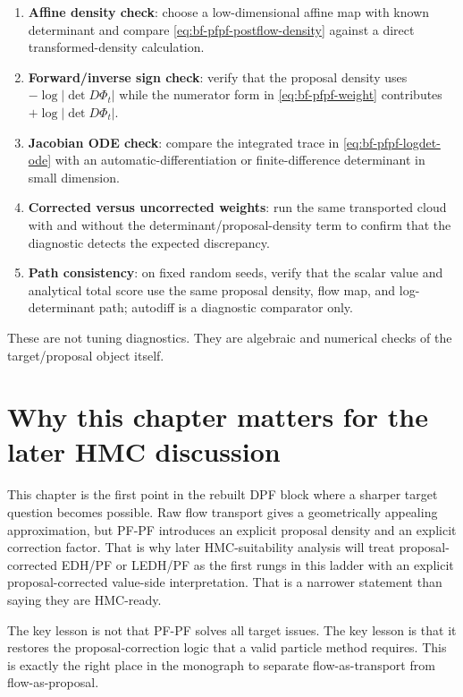 \begin{enumerate}[label=(\roman*)]
  \item \textbf{Affine density check}: choose a low-dimensional affine map with
    known determinant and compare \eqref{eq:bf-pfpf-postflow-density} against a
    direct transformed-density calculation.
  \item \textbf{Forward/inverse sign check}: verify that the proposal density
    uses $-\log|\det D\Phi_t|$ while the numerator form in
    \eqref{eq:bf-pfpf-weight} contributes $+\log|\det D\Phi_t|$.
  \item \textbf{Jacobian ODE check}: compare the integrated trace in
    \eqref{eq:bf-pfpf-logdet-ode} with an automatic-differentiation or
    finite-difference determinant in small dimension.
  \item \textbf{Corrected versus uncorrected weights}: run the same transported
    cloud with and without the determinant/proposal-density term to confirm that
    the diagnostic detects the expected discrepancy.
  \item \textbf{Path consistency}: on fixed random seeds, verify that the scalar
    value and analytical total score use the same proposal density, flow map,
    and log-determinant path; autodiff is a diagnostic comparator only.
\end{enumerate}

These are not tuning diagnostics.  They are algebraic and numerical checks of
the target/proposal object itself.

\section{Why this chapter matters for the later HMC discussion}
\label{sec:bf-pfpf-hmc-bridge}

This chapter is the first point in the rebuilt DPF block where a sharper target
question becomes possible.  Raw flow transport gives a geometrically appealing
approximation, but PF-PF introduces an explicit proposal density and an explicit
correction factor.  That is why later HMC-suitability analysis will treat
proposal-corrected EDH/PF or LEDH/PF as the first rungs in this ladder with an
explicit proposal-corrected value-side interpretation.  That is a narrower
statement than saying they are HMC-ready.

The key lesson is not that PF-PF solves all target issues.  The key lesson is
that it restores the proposal-correction logic that a valid particle method
requires.  This is exactly the right place in the monograph to separate
flow-as-transport from flow-as-proposal.

